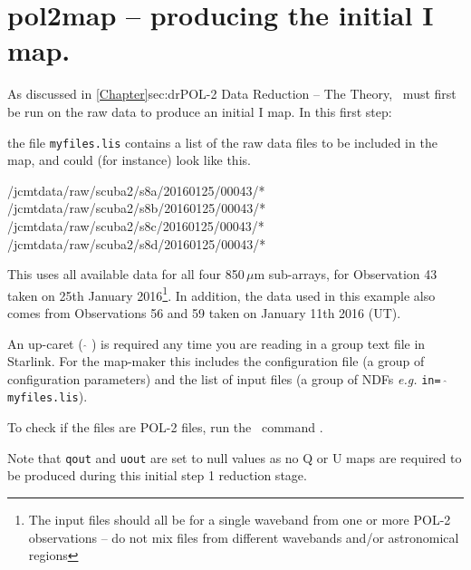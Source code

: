 \section{pol2map -- producing the initial I map.}
\label{sec:how-step1}

As discussed in \cref{Chapter}{sec:dr}{POL-2 Data Reduction -- The
  Theory}, \poltwomap\ must first be run on the raw data to produce an
initial I map.  In this first step:

\begin{terminalv}
\end{terminalv}

the file \texttt{myfiles.lis} contains a list of the raw data
files to be included in the map, and could (for instance) look like
this.

\begin{terminalv}
/jcmtdata/raw/scuba2/s8a/20160125/00043/*
/jcmtdata/raw/scuba2/s8b/20160125/00043/*
/jcmtdata/raw/scuba2/s8c/20160125/00043/*
/jcmtdata/raw/scuba2/s8d/20160125/00043/*
\end{terminalv}

This uses all available data for all four 850\,$\mu$m sub-arrays, for
Observation 43 taken on 25th January 2016\footnote{The input files
  should all be for a single waveband from one or more POL-2
  observations -- do not mix files from different wavebands and/or
  astronomical regions}. In addition, the data used in this example
also comes from Observations 56 and 59 taken on January 11th 2016 (UT).

\begin{tip}
  An up-caret ( $ \hat{} $ ) is required any time you are reading in a
  group text file in Starlink. For the map-maker this includes the
  configuration file (a group of configuration parameters) and the
  list of input files (a group of NDFs \emph{e.g.} \texttt{in= $
    \hat{} $ myfiles.lis}).

  To check if the files are POL-2 files, run the \smurf\ command
  .
\begin{terminalv}
\end{terminalv}
\end{tip}

Note that \texttt{qout} and \texttt{uout} are set to null values as no
Q or U maps are required to be produced during this initial step 1
reduction stage.

